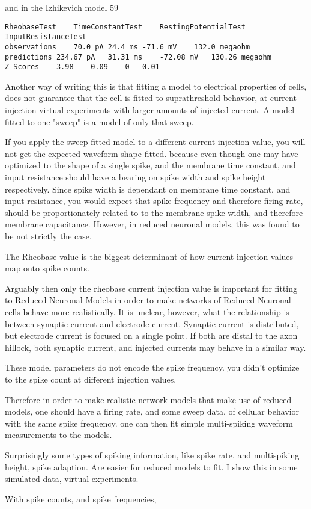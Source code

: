 and in the Izhikevich model $59$

\begin{verbatim}
RheobaseTest	TimeConstantTest	RestingPotentialTest	InputResistanceTest
observations	70.0 pA	24.4 ms	-71.6 mV	132.0 megaohm
predictions	234.67 pA	31.31 ms	-72.08 mV	130.26 megaohm
Z-Scores	3.98	0.09	0	0.01
\end{verbatim}

Another way of writing this is that fitting a model to electrical properties of cells, does not
guarantee that the cell is fitted to suprathreshold behavior, at current injection virtual experiments with larger amounts of injected current.
A model fitted to one "sweep" is a model of only that sweep. 

If you apply the sweep fitted model to a different current injection value, you will not get the expected waveform shape fitted.
because even though one may have optimized to the shape of a single spike, and the membrane time constant, and input resistance should have a bearing
 on spike width and spike height respectively. Since spike width is dependant on membrane time constant, and input resistance, you 
 would expect that spike frequency and therefore firing rate, should be proportionately related to 
 to the membrane spike width, and therefore membrane capacitance. However, in reduced neuronal models, this was found
 to be not strictly the case.

 The Rheobase value is the biggest determinant of how current injection values map onto spike counts.


 Arguably then only the rheobase current injection value is important for fitting to Reduced Neuronal Models in order to make networks of Reduced Neuronal cells behave more realistically.
 It is unclear, however, what the relationship is between synaptic current and electrode current. Synaptic current is distributed, but electrode current is focused on a single point.
 If both are distal to the axon hillock, both synaptic current, and injected currents may behave in a similar way.


 These model parameters do not encode the spike frequency.
you didn't optimize to the spike count at different injection values.

Therefore in order to make realistic network models that make use of reduced models, 
one should have a firing rate, and some sweep data, of cellular behavior with the same spike frequency.
one can then fit simple multi-spiking waveform measurements to the models.

Surprisingly some types of spiking information, like spike rate, and multispiking height, spike adaption.
Are easier for reduced models to fit. I show this in some simulated data, virtual experiments.

With spike counts, and spike frequencies, 
